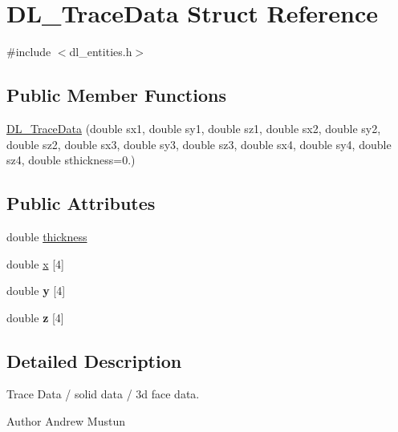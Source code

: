 \hypertarget{structDL__TraceData}{\section{D\-L\-\_\-\-Trace\-Data Struct Reference}
\label{structDL__TraceData}
}


{\ttfamily \#include $<$dl\-\_\-entities.\-h$>$}

\subsection*{Public Member Functions}
\begin{DoxyCompactItemize}
\item 
\hyperlink{structDL__TraceData_a64c65ddaa0014a7b87b99fc06c65f981}{D\-L\-\_\-\-Trace\-Data} (double sx1, double sy1, double sz1, double sx2, double sy2, double sz2, double sx3, double sy3, double sz3, double sx4, double sy4, double sz4, double sthickness=0.)
\end{DoxyCompactItemize}
\subsection*{Public Attributes}
\begin{DoxyCompactItemize}
\item 
double \hyperlink{structDL__TraceData_a3eb2e8613d1bcc2e1bb5a884d74fd7a2}{thickness}
\item 
double \hyperlink{structDL__TraceData_a061ef5c051ca446592323d034c8aa098}{x} \mbox{[}4\mbox{]}
\item 
\hypertarget{structDL__TraceData_a418318cbf72942cd804f30fe93803758}{double {\bfseries y} \mbox{[}4\mbox{]}}\label{structDL__TraceData_a418318cbf72942cd804f30fe93803758}

\item 
\hypertarget{structDL__TraceData_a3b948b2001e96ae7a865e7a24a8a59ca}{double {\bfseries z} \mbox{[}4\mbox{]}}\label{structDL__TraceData_a3b948b2001e96ae7a865e7a24a8a59ca}

\end{DoxyCompactItemize}


\subsection{Detailed Description}
Trace Data / solid data / 3d face data.

\begin{DoxyAuthor}{Author}
Andrew Mustun 
\end{DoxyAuthor}


